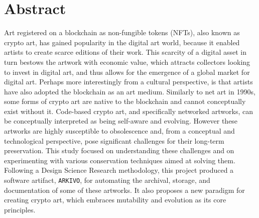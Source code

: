 \chapter*{Abstract}




Art registered on a blockchain as non-fungible tokens (NFTs), also known as crypto art, has gained popularity in the digital art world, because it enabled artists to create scarce editions of their work. This scarcity of a digital asset in turn bestows the artwork with economic value, which attracts collectors looking to invest in digital art, and thus allows for the emergence of a global market for digital art. Perhaps more interestingly from a cultural perspective, is that artists have also adopted the blockchain as an art medium. Similarly to net art in 1990s, some forms of crypto art are native to the blockchain and cannot conceptually exist without it. Code-based crypto art, and specifically networked artworks, can be conceptually interpreted as being self-aware and evolving. However these artworks are highly susceptible to obsolescence and, from a conceptual and technological perspective, pose significant challenges for their long-term preservation.
This study focused on understanding these challenges and on experimenting with various conservation techniques aimed at solving them. Following a Design Science Research methodology, this project produced a software artifact, \texttt{ARKIVO}, for automating the archival, storage, and documentation of some of these artworks. It also proposes a new paradigm for creating crypto art, which embraces mutability and evolution as its core principles.
